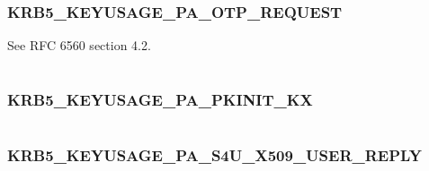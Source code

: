 \documentclass[letterpaper,10pt,english]{sphinxmanual}
\begin{document}
\subsubsection{KRB5\_KEYUSAGE\_PA\_OTP\_REQUEST}
\label{appdev/refs/macros/KRB5_KEYUSAGE_PA_OTP_REQUEST:krb5-keyusage-pa-otp-request}\label{appdev/refs/macros/KRB5_KEYUSAGE_PA_OTP_REQUEST:krb5-keyusage-pa-otp-request-data}\label{appdev/refs/macros/KRB5_KEYUSAGE_PA_OTP_REQUEST::doc}

\begin{fulllineitems}
\label{appdev/refs/macros/KRB5_KEYUSAGE_PA_OTP_REQUEST:KRB5_KEYUSAGE_PA_OTP_REQUEST}
\end{fulllineitems}


See RFC 6560 section 4.2.

\begin{tabulary}{\linewidth}{|L|L|}
\hline

 & 
\\
\hline\end{tabulary}



\subsubsection{KRB5\_KEYUSAGE\_PA\_PKINIT\_KX}
\label{appdev/refs/macros/KRB5_KEYUSAGE_PA_PKINIT_KX::doc}\label{appdev/refs/macros/KRB5_KEYUSAGE_PA_PKINIT_KX:krb5-keyusage-pa-pkinit-kx-data}\label{appdev/refs/macros/KRB5_KEYUSAGE_PA_PKINIT_KX:krb5-keyusage-pa-pkinit-kx}

\begin{fulllineitems}
\label{appdev/refs/macros/KRB5_KEYUSAGE_PA_PKINIT_KX:KRB5_KEYUSAGE_PA_PKINIT_KX}
\end{fulllineitems}


\begin{tabulary}{\linewidth}{|L|L|}
\hline

 & 
\\
\hline\end{tabulary}



\subsubsection{KRB5\_KEYUSAGE\_PA\_S4U\_X509\_USER\_REPLY}
\label{appdev/refs/macros/KRB5_KEYUSAGE_PA_S4U_X509_USER_REPLY:krb5-keyusage-pa-s4u-x509-user-reply-data}\label{appdev/refs/macros/KRB5_KEYUSAGE_PA_S4U_X509_USER_REPLY:krb5-keyusage-pa-s4u-x509-user-reply}\label{appdev/refs/macros/KRB5_KEYUSAGE_PA_S4U_X509_USER_REPLY::doc}
\end{document}
